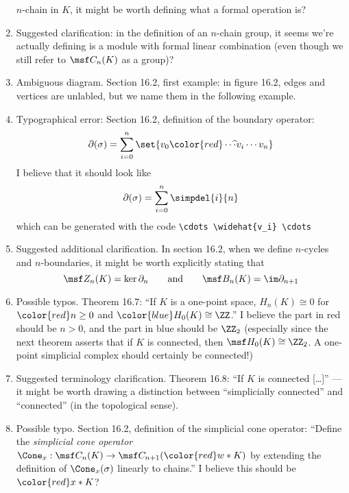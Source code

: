 \documentclass{fkletter}
\begin{document}
\begin{enumerate}
    $n$-chain in $K$, it might be worth defining what a formal operation is?
  \item Suggested clarification: in the definition of an $n$-chain group, it
    seems we're actually defining is a module with formal linear combination
    (even though we still refer to $\msf C_n(K)$ as a group)?
  \item Ambiguous diagram. Section 16.2, first example: in figure 16.2, edges
    and vertices are unlabled, but we name them in the following example.
  \item Typographical error: Section 16.2, definition of the boundary operator:
    \[
      \partial(\sigma) = \sum_{i=0}^n \set{v_0 {\color{red}\cdots\hspace{-.16cm}
          \widehat{\ } v_i} \cdots v_n}
    \]
    I believe that it should look like
    \[
      \partial(\sigma) = \sum_{i=0}^n \simpdel{i}{n}
    \]
    which can be generated with the code \verb|\cdots \widehat{v_i} \cdots|

  \item Suggested additional clarification. In section 16.2, when we define
    $n$-cycles and $n$-boundaries, it might be worth explicitly stating that
    \[
      \msf Z_n(K) = \ker \partial_n \qquad \text{and} \qquad \msf B_n(K) =
      \im\partial_{n+1}
    \]
  \item Possible typos. Theorem 16.7: ``If $K$ is a one-point space, $H_n(K)
    \cong 0$ for $\color{red} n \geq 0$ and $\color{blue}H_0(K) \cong \ZZ$.'' I
    believe the part in red should be $n > 0$, and the part in blue should be
    $\ZZ_2$ (especially since the next theorem asserts that if $K$ is connected,
    then $\msf H_0(K) \cong \ZZ_2$. A one-point simplicial complex should
    certainly be connected!)
  \item Suggested terminology clarification. Theorem 16.8: ``If $K$ is
    {\color{red} connected} [\ldots]'' --- it might be worth drawing a
    distinction between ``simplicially connected'' and ``connected'' (in the
    topological sense).
  \item Possible typo. Section 16.2, definition of the simplicial cone operator:
    ``Define the \emph{simplicial cone operator} $\Cone_x : \msf C_n(K) \to \msf
    C_{n+1}({\color{red}w*K})$ by extending the definition of $\Cone_x(\sigma)$
    linearly to chains.'' I believe this should be ${\color{red}x * K}$?
\end{enumerate}
\end{document}
